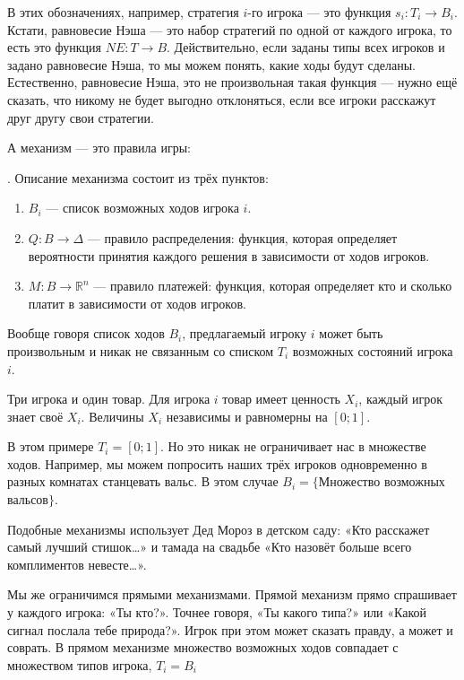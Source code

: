 В этих обозначениях, например, стратегия $ i $-го игрока — это функция $ s_{i}:T_{i}\to B_{i} $. Кстати, равновесие Нэша — это набор стратегий по одной от каждого игрока, то есть это функция $ NE:T\to B $. Действительно, если заданы типы всех игроков и задано равновесие Нэша, то мы можем понять, какие ходы будут сделаны. Естественно, равновесие Нэша, это не произвольная такая функция — нужно ещё сказать, что никому не будет выгодно отклоняться, если все игроки расскажут друг другу свои стратегии.

А механизм — это правила игры:

\begin{mydef} . Описание механизма состоит из трёх пунктов:
\begin{enumerate}
\item $ B_{i} $ — список возможных ходов игрока $ i $.
\item $Q:B\to \Delta  $ — правило распределения: функция, которая определяет вероятности принятия каждого решения в зависимости от ходов игроков.
\item $M:B\to \mathbb{R}^{n}  $ — правило платежей: функция, которая определяет кто и сколько платит в зависимости от ходов игроков.
\end{enumerate}
\end{mydef}

Вообще говоря список ходов $ B_{i} $, предлагаемый игроку $ i $ может быть произвольным и никак не связанным со списком $ T_{i} $ возможных состояний игрока $ i $.

\begin{myex}
Три игрока и один товар. Для игрока $ i $ товар имеет ценность $ X_{i} $, каждый игрок знает своё $ X_{i} $. Величины $ X_{i}  $ независимы и равномерны на $ [0;1] $.

В этом примере $ T_{i}=[0;1] $. Но это никак не ограничивает нас в множестве ходов. Например, мы можем попросить наших трёх игроков одновременно в разных комнатах станцевать вальс. В этом случае $B_{i} =\{ $Множество возможных вальсов$\}$.
\end{myex}

Подобные механизмы использует Дед Мороз в детском саду: «Кто расскажет самый лучший стишок\ldots» и тамада на свадьбе «Кто назовёт больше всего комплиментов невесте\ldots».

Мы же ограничимся прямыми механизмами. Прямой механизм прямо спрашивает у каждого игрока: «Ты кто?». Точнее говоря, «Ты какого типа?» или «Какой сигнал послала тебе природа?». Игрок при этом может сказать правду, а может и соврать. В прямом механизме множество возможных ходов совпадает с множеством типов игрока, $ T_{i}=B_{i} $

